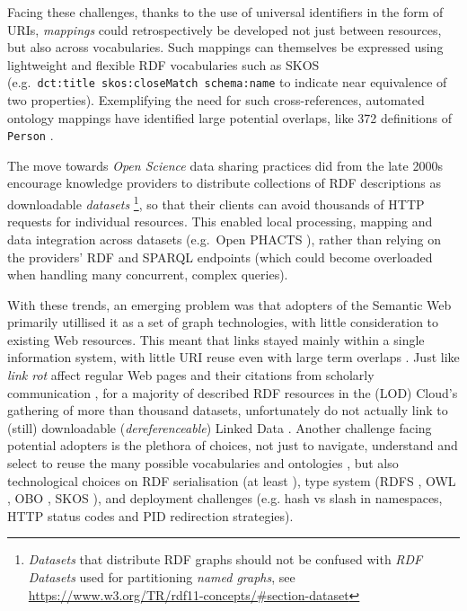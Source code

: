Facing these challenges, thanks to the use of universal identifiers in the form of URIs, \emph{mappings} could retrospectively be developed not just between resources, but also across vocabularies. Such mappings can themselves be expressed using lightweight and flexible RDF vocabularies such as SKOS \cite{Isaac 2009} (e.g.~\texttt{dct:title\ skos:closeMatch\ schema:name} to indicate near equivalence of two properties). Exemplifying the need for such cross-references, automated ontology mappings have identified large potential overlaps, like 372 definitions of \texttt{Person} \cite{Hu 2011}.


The move towards \emph{Open Science} data sharing practices did from the late 2000s encourage knowledge providers to distribute collections of RDF descriptions as downloadable \emph{datasets} \footnote{\emph{Datasets} that distribute RDF graphs should not be confused with \emph{RDF Datasets} used for partitioning \emph{named graphs}, see \url{https://www.w3.org/TR/rdf11-concepts/\#section-dataset}}, so that their clients can avoid thousands of HTTP requests for individual resources\label{ch20:avoid-lots-of-requests}. This enabled local processing, mapping and data integration across datasets (e.g.~Open PHACTS \cite{Groth 2014}), rather than relying on the providers' RDF and SPARQL endpoints (which could become overloaded when handling many concurrent, complex queries).

With these trends, an emerging problem was that adopters of the Semantic Web primarily utillised it as a set of graph technologies, with little consideration to existing Web resources. This meant that links stayed mainly within a single information system, with little URI reuse even with large term overlaps \cite{Kamdar 2017}. Just like \emph{link rot} affect regular Web pages and their citations from scholarly communication \cite{Klein 2014}, for a majority of described RDF resources in the  (LOD) Cloud's gathering of more than thousand datasets, unfortunately do not actually link to (still) downloadable (\emph{dereferenceable}) Linked Data \cite{Polleres 2020}. Another challenge facing potential adopters is the plethora of choices, not just to navigate, understand and select to reuse the many possible vocabularies and ontologies \cite{Carriero 2010}, but also technological choices on RDF serialisation (at least ), type system (RDFS \cite{Guha 2014}, OWL \cite{W3C 2012}, OBO \cite{Tirmizi 2011}, SKOS \cite{Isaac 2009}), and deployment challenges \cite{Sauermann 2008} (e.g. hash vs slash in namespaces, HTTP status codes and PID redirection strategies).


